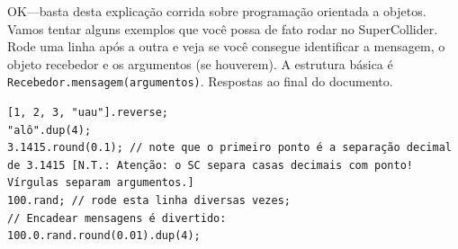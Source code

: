 OK---basta desta explicação corrida sobre programação orientada a objetos. Vamos tentar alguns exemplos que você possa de fato rodar no SuperCollider. Rode uma linha após a outra e veja se você consegue identificar a mensagem, o objeto recebedor e os argumentos (se houverem). A estrutura básica é \texttt{Recebedor.mensagem(argumentos)}. Respostas ao final do documento.

 
\begin{lstlisting}[style=SuperCollider-IDE, basicstyle=\scttfamily\footnotesize]
[1, 2, 3, "uau"].reverse;
"alô".dup(4); 
3.1415.round(0.1); // note que o primeiro ponto é a separação decimal de 3.1415 [N.T.: Atenção: o SC separa casas decimais com ponto! Vírgulas separam argumentos.]
100.rand; // rode esta linha diversas vezes;
// Encadear mensagens é divertido:
100.0.rand.round(0.01).dup(4);
\end{lstlisting}
